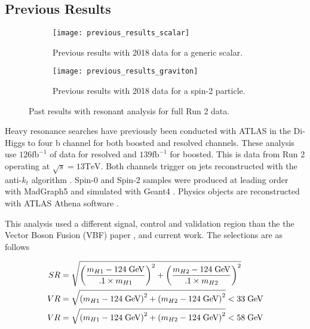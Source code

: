 \documentclass[12pt]{article}
\begin{document}
\subsection{Previous Results}
\begin{figure}[t]
    \centering
    \begin{subfigure}[t]{.48\textwidth}
        \centering
        \texttt{[image: previous\_results\_scalar]}
        \caption{Previous results with 2018 data for a generic scalar.}
        \label{subfig:previous_results_scalar}
    \end{subfigure}
    \hfill
    \begin{subfigure}[t]{.48\textwidth}
        \centering
        \texttt{[image: previous\_results\_graviton]}
        \caption{Previous results with 2018 data for a spin-2 particle.}
        \label{subfig:previous_results_graviton}
    \end{subfigure}
\caption{Past results with resonant analysis for full Run 2 data.}
\label{fig:previous_results}
\end{figure}

Heavy resonance searches have previously been conducted with ATLAS in the Di-Higgs
to four b channel for both boosted and resolved channels. These analysis use
$126 \text{fb}^{-1}$ of data for resolved and $139\text{fb}^{-1}$ for boosted.
This is data from Run 2 operating at $\sqrt{s}=13\text{TeV}$. Both channels
trigger on jets reconstructed with the anti-$k_t$ algorithm \cite{antikt}.
Spin-0 and Spin-2 samples were produced at leading order with MadGraph5
\cite{madgraph5_OG} and simulated with Geant4 \cite{geant4}. Physics objects are
reconstructed with ATLAS Athena software \cite{atlas_simulation}.

This analysis used a different signal, control and validation region than the
the Vector Boson Fusion (VBF) paper \cite{atlas_hhbbbb_vbf}, and current work. The
selections are as follows

\begin{align} \label{eq:vbf_sr}
    SR &= \sqrt{\left( \frac{m_{H1} - 124\;\text{GeV}}{.1\times m_{H1} } \right)^2 +
    \left( \frac{m_{H2} - 124\;\text{GeV}}{.1\times m_{H2}} \right)^2} \\
    VR &= \sqrt{\left( m_{H1} - 124\;\text{GeV} \right)^2 + \left( m_{H2} -
    124\;\text{GeV} \right)^2} < 33\;\text{GeV} \\
    VR &= \sqrt{\left( m_{H1} - 124\;\text{GeV} \right)^2 + \left( m_{H2} -
    124\;\text{GeV} \right)^2} < 58\;\text{GeV}
\end{align}
\end{document}
